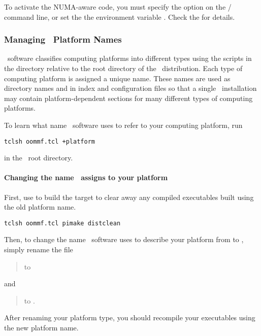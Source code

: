 To activate the NUMA-aware code, you must specify the 
option on the / command line, or set the the
environment variable
.
Check the  for details.

\subsubsection{Managing \OOMMF\ Platform Names}\label{sec:platformNames}

\OOMMF\ software classifies computing platforms into different types
using the scripts in the directory  relative to the
root directory of the \OOMMF\ distribution.  
Each type of computing platform is assigned a unique name.  
These names are used as directory names
and in index and configuration files so that a single 
\OOMMF\ installation may contain platform-dependent sections for many
different types of computing platforms.

To learn what name \OOMMF\ software uses to refer to your computing
platform, run 
\begin{verbatim}
tclsh oommf.tcl +platform
\end{verbatim}
in the \OOMMF\ root directory.

\paragraph{Changing the name \OOMMF\ assigns to your platform}

First, use 
to build the target  to
clear away any compiled executables built using the old platform
name.
\begin{verbatim}
tclsh oommf.tcl pimake distclean
\end{verbatim}
Then, to change the name \OOMMF\ software uses to describe your platform from 
 to , simply rename the file
\begin{quote}
\hspace{1em} to \hspace{1em}
\end{quote}
and
\begin{quote}
\hspace{1em} to \hspace{1em}
.
\end{quote}
After renaming your platform type, you should recompile your executables
using the new platform name.


